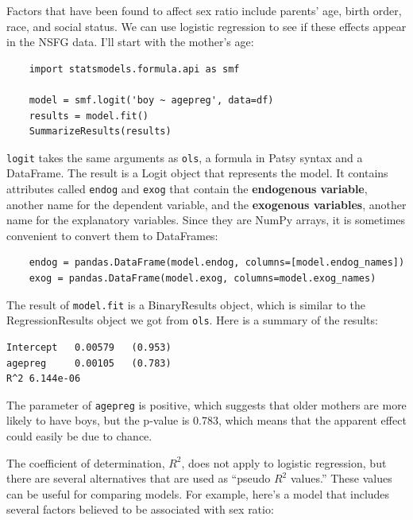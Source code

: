 \documentclass[12pt]{book}
\begin{document}
Factors that have been found to affect sex ratio include parents'
age, birth order, race, and social status.  We can use logistic
regression to see if these effects appear in the NSFG data.  I'll
start with the mother's age:

\begin{verbatim}
    import statsmodels.formula.api as smf

    model = smf.logit('boy ~ agepreg', data=df)
    results = model.fit()
    SummarizeResults(results)
\end{verbatim}

{\tt logit} takes the same arguments as {\tt ols}, a formula
in Patsy syntax and a DataFrame.  The result is a Logit object
that represents the model.  It contains attributes called
{\tt endog} and {\tt exog} that contain the {\bf endogenous
variable}, another name for the dependent variable,
and the {\bf exogenous variables}, another name for the
explanatory variables.  Since they are NumPy arrays, it is
sometimes convenient to convert them to DataFrames:

\begin{verbatim}
    endog = pandas.DataFrame(model.endog, columns=[model.endog_names])
    exog = pandas.DataFrame(model.exog, columns=model.exog_names)
\end{verbatim}

The result of {\tt model.fit} is a BinaryResults object, which is
similar to the RegressionResults object we got from {\tt ols}.
Here is a summary of the results:

\begin{verbatim}
Intercept   0.00579   (0.953)
agepreg     0.00105   (0.783)
R^2 6.144e-06
\end{verbatim}

The parameter of {\tt agepreg} is positive, which suggests that
older mothers are more likely to have boys, but the p-value is
0.783, which means that the apparent effect could easily be due
to chance.

The coefficient of determination, $R^2$, does not apply to logistic
regression, but there are several alternatives that are used
as ``pseudo $R^2$ values.''  These values can be useful for comparing
models.  For example, here's a model that includes several factors
believed to be associated with sex ratio:
\end{document}
